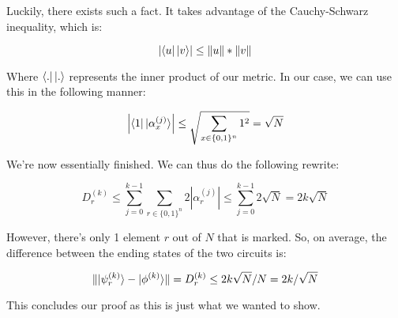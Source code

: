 \documentclass[11pt]{article}
\newcommand{\abs}[1]{\left\lvert #1 \right\rvert}
\begin{document}
Luckily, there exists such a fact. It takes advantage of the Cauchy-Schwarz inequality, which is:

{
\[\abs{\bra{u}\ket{v}} \leq \lVert u \rVert * \lVert v \rVert\]
}

Where $\bra{.}\ket{.}$ represents the inner product of our metric. In our case, we can use this in the following manner:

{
\[\abs{\bra{1}\ket{\alpha_x^{(j)}}} \leq \sqrt{ \sum_{x\in\{0,1\}^n}1^2  } = \sqrt{N}\]
}

We're now essentially finished. We can thus do the following rewrite:

{
\[D_r^{(k)} \leq \sum_{j=0}^{k-1}\sum_{r\in\{0,1\}^n} 2\abs{\alpha_r^{(j)}} \leq \sum_{j=0}^{k-1} 2\sqrt{N} = 2k\sqrt{N} \]
}

However, there's only 1 element $r$ out of $N$ that is marked. So, on average, the difference between the ending states of the two circuits is:

{
\[\lVert \ket{\psi_r^{(k)}} - \ket{\phi^{(k)}} \rVert = D^{(k)}_r \leq 2k\sqrt{N}/N = 2k/\sqrt{N}\]
}

This concludes our proof as this is just what we wanted to show.
\end{document}
